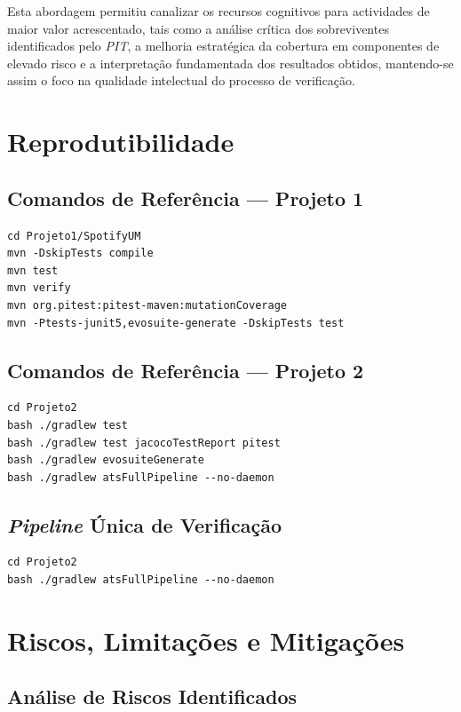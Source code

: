 \documentclass{article}
\begin{document}
Esta abordagem permitiu canalizar os recursos cognitivos para actividades de maior valor acrescentado, tais como a análise crítica dos sobreviventes identificados pelo \emph{PIT}, a melhoria estratégica da cobertura em componentes de elevado risco e a interpretação fundamentada dos resultados obtidos, mantendo-se assim o foco na qualidade intelectual do processo de verificação.

\section{Reprodutibilidade}

\subsection{Comandos de Referência --- Projeto 1}
\begin{lstlisting}[caption={Comandos de reprodução --- Projeto 1},label={lst:p1-commands}]
cd Projeto1/SpotifyUM
mvn -DskipTests compile
mvn test
mvn verify
mvn org.pitest:pitest-maven:mutationCoverage
mvn -Ptests-junit5,evosuite-generate -DskipTests test
\end{lstlisting}

\subsection{Comandos de Referência --- Projeto 2}
\begin{lstlisting}[caption={Comandos de reprodução --- Projeto 2},label={lst:p2-commands}]
cd Projeto2
bash ./gradlew test
bash ./gradlew test jacocoTestReport pitest
bash ./gradlew evosuiteGenerate
bash ./gradlew atsFullPipeline --no-daemon
\end{lstlisting}

\subsection{\emph{Pipeline} Única de Verificação}
\begin{lstlisting}[caption={Pipeline ATS agregada no Projeto 2},label={lst:pipeline-ats}]
cd Projeto2
bash ./gradlew atsFullPipeline --no-daemon
\end{lstlisting}

\section{Riscos, Limitações e Mitigações}

\subsection{Análise de Riscos Identificados}
\end{document}
